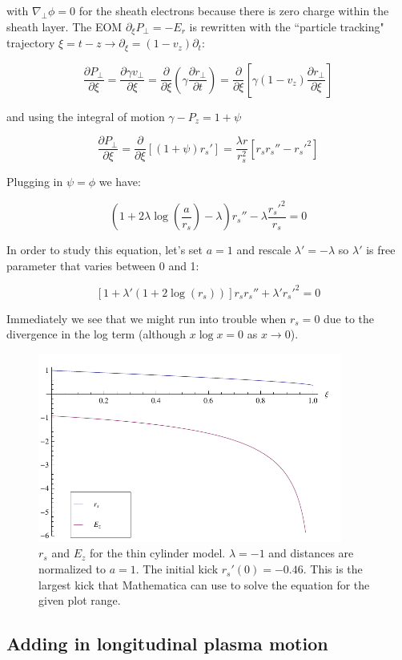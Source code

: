 \documentclass[aps,prl,preprint,groupedaddress]{revtex4-1}
\begin{document}
with $\nabla_{\perp} \phi = 0$ for the sheath electrons because there is zero charge within the sheath layer. The EOM $\partial_{\xi} P_{\perp} = -E_r$ is rewritten with the ``particle tracking" trajectory $\xi = t - z \rightarrow \partial_{\xi} = (1-v_z)\partial_t$:

\begin{equation}\label{eq:track}
\frac{\partial P_{\perp}}{\partial \xi} = \frac{\partial \gamma v_{\perp}}{\partial \xi} =  \frac{\partial}{\partial \xi}\left(\gamma \frac{\partial r_{\perp}}{\partial t}\right) = \frac{\partial}{\partial \xi}\left[\gamma (1-v_z)\frac{\partial r_{\perp}}{\partial \xi}\right]
\end{equation}

and using the integral of motion $\gamma - P_z = 1 + \psi$

\begin{equation}\label{eq:EOM}
\frac{\partial P_{\perp}}{\partial \xi} = \frac{\partial}{\partial \xi}[(1+\psi)r_s'] = \frac{\lambda r}{r_s^2}[r_s r_s'' - r_s'^2] 
\end{equation}

Plugging in $\psi = \phi$ we have:

\begin{equation}\label{eq:rs}
\left(1+2\lambda\log\left(\frac{a}{r_s}\right) - \lambda\right)r_s'' -\lambda\frac{r_s'^2}{r_s} = 0
\end{equation}

In order to study this equation, let's set $a=1$ and rescale $\lambda' = -\lambda$ so $\lambda'$ is free parameter that varies between 0 and 1:

\begin{equation}\label{eq:rs_simp}
[1+\lambda'(1+2\log(r_s))] r_s r_s'' + \lambda'r_s'^2 = 0
\end{equation}

Immediately we see that we might run into trouble when $r_s = 0$ due to the divergence in the log term (although $x\log x = 0$ as $x\rightarrow0$).

\begin{figure}[ht]\label{fig:sheath}
  \centering
    \includegraphics[width=100mm]{./figures/sheath.pdf}
      \caption{$r_s$ and $E_z$ for the thin cylinder model. $\lambda = -1$ and distances are normalized to $a=1$. The initial kick $r_s'(0) = -0.46$. This is the largest kick that Mathematica can use to solve the equation for the given plot range.}
\end{figure}

\subsection{Adding in longitudinal plasma motion}
\end{document}
